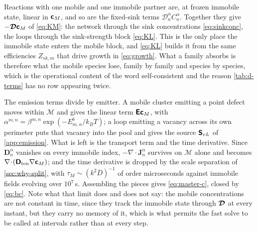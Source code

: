 Reactions with one mobile and one immobile partner are, at frozen immobile
state, linear in $\bm{\mathsf{c}}_M$, and so are the fixed-sink terms $\mathcal
D^\alpha_nC^\alpha_n$. Together they give $-\bm{\mathcal{D}}\bm{\mathsf{c}}_M$ of
\cref{eq:KM}: the network through the sink concentrations \cref{eq:sinkconc},
the loops through the sink-strength block \cref{eq:KL}. This is the only place
the immobile state enters the mobile block, and \cref{eq:KL} builds it from the
same efficiencies $Z_{sk,m}$ that drive growth in \cref{eq:growth}. What a
family absorbs is therefore what the mobile species lose, family by family and
species by species, which is the operational content of the word
self-consistent and the reason \cref{tab:d-terms} has no row appearing twice.

The emission terms divide by emitter. A mobile cluster emitting a point defect
moves within $\mathcal M$ and gives the linear term $\bm{\mathsf{E}}\bm{\mathsf{c}}_M$, with
$\alpha^{m,n}=\beta^{m,n}\exp(-E^{b}_{m,n}/k_BT)$; a loop emitting a vacancy
across its own perimeter puts that vacancy into the pool and gives the source
$\bm{\mathsf{S}}_{vL}$ of \cref{app:emission}. What is left is the transport term and
the time derivative. Since $\bm D^\alpha_n$ vanishes on every immobile index,
$-\nabla\!\cdot\!\bm J^\alpha_n$ survives on $\mathcal M$ alone and becomes
$\nabla\!\cdot\!(\bm{\mathsf{D}}_{\mathrm{ten}}\nabla\bm{\mathsf{c}}_M)$; and the time
derivative is dropped by the scale separation of \cref{sec:why-split}, with
$\tau_M\sim(k^{2}\overline D)^{-1}$ of order microseconds against immobile
fields evolving over $10^{7}\,$s. Assembling the pieces gives
\cref{eq:master-c}, closed by \cref{eq:bc}. Note what that limit does and
does not say: the mobile concentrations are not constant in time, since they
track the immobile state through $\bm{\mathcal{D}}$ at every instant, but they carry no
memory of it, which is what permits the fast solve to be called at intervals
rather than at every step.

